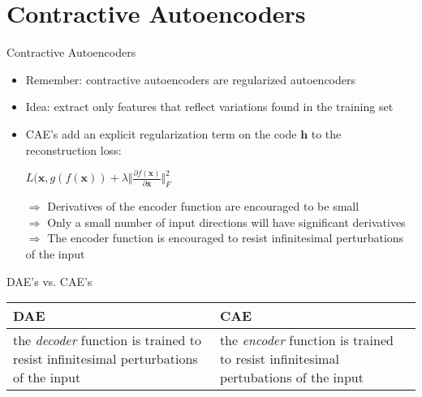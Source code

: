 \documentclass[handout]{beamer}
\begin{document}
\section{Contractive Autoencoders}
\begin{frame}[t]{Contractive Autoencoders}
   \begin{itemize}
       \item Remember: contractive autoencoders are regularized autoencoders
        \pause
       \item Idea: extract only features that reflect variations found in the training set
        \pause
       \item CAE's add an explicit regularization term on the code $\pmb{h}$ to the reconstruction loss:\\
           \begin{center}
       $L(\pmb{x}, g(f(\pmb{x})) + \lambda \Vert \frac{\partial f(\pmb{x})}{\partial \pmb{x}} \Vert^2_F$ 
   \end{center}
        \pause
  $\Rightarrow$  Derivatives of the encoder function are encouraged to be small\\
        \pause
    $\Rightarrow$ Only a small number of input directions will have significant derivatives\\ 
        \pause
   $\Rightarrow$ The encoder function is encouraged to resist infinitesimal perturbations of the input
   \end{itemize} 
\end{frame}

\begin{frame}[t]{DAE's vs. CAE's}
    \begin{table}[h!]
        \centering
        \label{tab:}
        \begin{tabular}{p{5cm}|p{5cm}}
            \textbf{DAE} & \textbf{CAE}\\
            \hline
            \pause
            the \textit{decoder} function is trained to resist infinitesimal perturbations of the input & \pause the \textit{encoder} function is trained to resist infinitesimal pertubations of the input
        \end{tabular}
    \end{table}
\end{frame}

        
\end{document}

